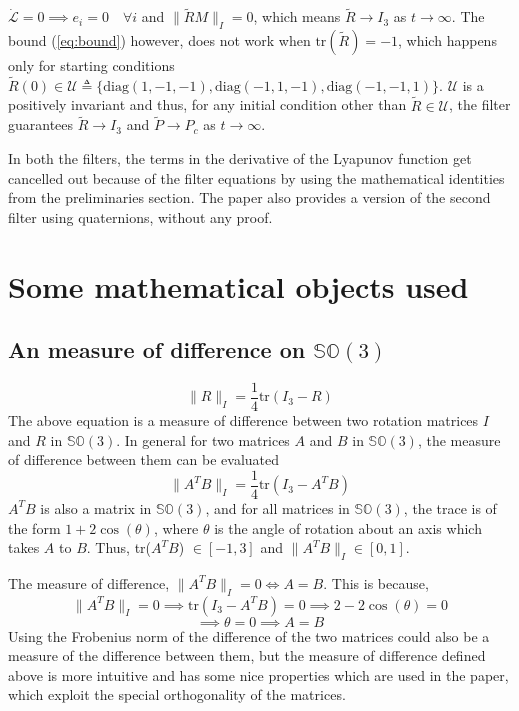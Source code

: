 \documentclass[12pt]{article}
\begin{document}
$\dot{\mathcal{L}} = 0 \implies e_i = 0 \quad \forall i$ and $\| \tilde{R}M\|_I = 0$, which means $\tilde{R} \rightarrow I_3$ as $t \rightarrow \infty$.
The bound (\ref{eq:bound}) however, does not work when $\text{tr}(\tilde R) = -1$, which happens only for starting conditions 
$\tilde R (0) \in \mathcal{U} \triangleq \{ \text{diag}(1, -1, -1), \text{diag}(-1, 1, -1), \text{diag}(-1, -1, 1) \}$.
$\mathcal{U}$ is a positively invariant and thus, for any initial condition other than $\tilde{R} \in \mathcal{U}$, 
the filter guarantees $\tilde{R} \rightarrow I_3$ and $\tilde P \rightarrow P_c$ as $t \rightarrow \infty$.

In both the filters, the terms in the derivative of the Lyapunov function get cancelled out because of the filter equations by using the mathematical identities
from the preliminaries section. The paper also provides a version of the second 
filter using quaternions, without any proof. 











\section{Some mathematical objects used}
\subsection{An measure of difference on $\mathbb{SO}(3)$}
\begin{equation}
    \| R \|_I = \frac{1}{4} \text{tr} (I_3 - R)
\end{equation}
The above equation is a measure of difference between two rotation matrices $I$ and $R$ in $\mathbb{SO}(3)$. In general for two matrices $A$ and $B$ in $\mathbb{SO}(3)$, the measure of difference between them can be evaluated
\begin{equation}
    \| A^T B \|_I = \frac{1}{4} \text{tr} (I_3 - A^T B)
\end{equation}
 $A^TB$ is also a matrix in $\mathbb{SO}(3)$, and for all matrices in $\mathbb{SO}(3)$, the trace is of the form $1 + 2\cos(\theta)$, where $\theta$ is the angle of rotation about an axis which takes $A$ to $B$. 
 Thus, tr($A^TB$) $\in [-1, 3]$ and $\| A^TB \|_I \in [0, 1]$.
 
 The measure of difference, $\| A^TB \|_I = 0 \iff A = B$. This is because, 
 \[\| A^TB \|_I = 0 \implies \text{tr} (I_3 - A^TB) = 0 \implies 2 - 2\cos(\theta) = 0\]
 \[\implies \theta = 0 \implies A = B\]
Using the Frobenius norm of the difference of the two matrices could also be a measure of 
the difference between them, but the measure of difference defined above is more intuitive and 
has some nice properties which are used in the paper, which exploit the special orthogonality of the matrices. 
\end{document}
